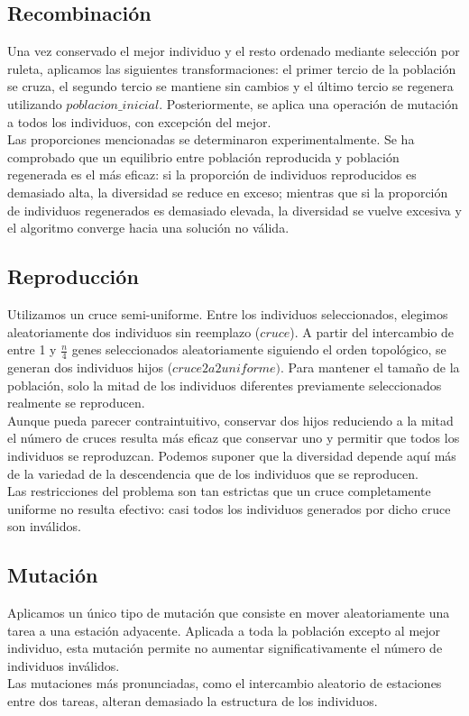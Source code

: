 \documentclass[12pt]{report}
\begin{document}
\subsection{Recombinación}

Una vez conservado el mejor individuo y el resto ordenado mediante selección por ruleta, aplicamos las siguientes transformaciones: el primer tercio de la población se cruza, el segundo tercio se mantiene sin cambios y el último tercio se regenera utilizando $poblacion\_inicial$.
Posteriormente, se aplica una operación de mutación a todos los individuos, con excepción del mejor.\\

Las proporciones mencionadas se determinaron experimentalmente. Se ha comprobado que un equilibrio entre población reproducida y población regenerada es el más eficaz: si la proporción de individuos reproducidos es demasiado alta, la diversidad se reduce en exceso; mientras que si la proporción de individuos regenerados es demasiado elevada, la diversidad se vuelve excesiva y el algoritmo converge hacia una solución no válida.

\subsection{Reproducción}

Utilizamos un cruce semi-uniforme. Entre los individuos seleccionados, elegimos aleatoriamente dos individuos sin reemplazo ($cruce$). A partir del intercambio de entre 1 y \( \frac{n}{4} \) genes seleccionados aleatoriamente siguiendo el orden topológico, se generan dos individuos hijos ($cruce2a2uniforme)$. Para mantener el tamaño de la población, solo la mitad de los individuos diferentes previamente seleccionados realmente se reproducen. \\
Aunque pueda parecer contraintuitivo, conservar dos hijos reduciendo a la mitad el número de cruces resulta más eficaz que conservar uno y permitir que todos los individuos se reproduzcan. Podemos suponer que la diversidad depende aquí más de la variedad de la descendencia que de los individuos que se reproducen.\\

Las restricciones del problema son tan estrictas que un cruce completamente uniforme no resulta efectivo: casi todos los individuos generados por dicho cruce son inválidos.

\subsection{Mutación}

Aplicamos un único tipo de mutación que consiste en mover aleatoriamente una tarea a una estación adyacente. Aplicada a toda la población excepto al mejor individuo, esta mutación permite no aumentar significativamente el número de individuos inválidos.\\
Las mutaciones más pronunciadas, como el intercambio aleatorio de estaciones entre dos tareas, alteran demasiado la estructura de los individuos.
\end{document}
